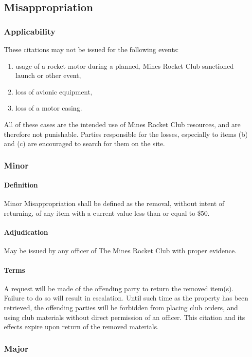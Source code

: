 \documentclass[12pt]{article}
\begin{document}
\subsection{Misappropriation}
\subsubsection{Applicability}
These citations may not be issued for the following events:
\begin{enumerate}[label=(\roman*)]
    \item usage of a rocket motor during a planned, Mines Rocket Club sanctioned launch or other event,
    \item loss of avionic equipment,
    \item loss of a motor casing.
\end{enumerate}
All of these cases are the intended use of Mines Rocket Club resources, and are therefore not punishable.
Parties responsible for the losses, especially to items (b) and (c) are encouraged to search for them on the site.
\subsubsection{Minor}
\paragraph{Definition}
Minor Misappropriation shall be defined as the removal, without intent of returning, 
of any item with a current value less than or equal to \$50.
\paragraph{Adjudication}
\label{misap:adj}
May be issued by any officer of The Mines Rocket Club with proper evidence.
\paragraph{Terms}
\label{misap:terms}
A request will be made of the offending party to return the removed item(s).
Failure to do so will result in escalation.
Until such time as the property has been retrieved,
the offending parties will be forbidden from placing club orders, 
and using club materials without direct permission of an officer.
This citation and its effects expire upon return of the removed materials.
\subsubsection{Major}
\end{document}
